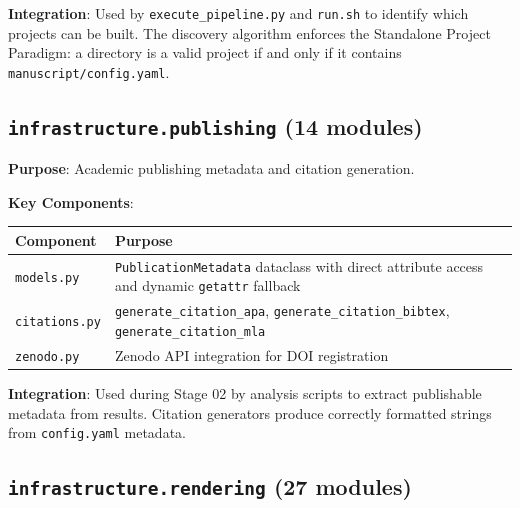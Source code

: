 \documentclass[
]{article}
\newcounter{none} %
\begin{document}
\textbf{Integration}: Used by \texttt{execute\_pipeline.py} and
\texttt{run.sh} to identify which projects can be built. The discovery
algorithm enforces the Standalone Project Paradigm: a directory is a
valid project if and only if it contains
\texttt{manuscript/config.yaml}.

\subsection{\texorpdfstring{\texttt{infrastructure.publishing} (14
modules)}{infrastructure.publishing (14 modules)}}\label{infrastructure.publishing-14-modules}

\textbf{Purpose}: Academic publishing metadata and citation generation.

\textbf{Key Components}:

{\def\LTcaptype{none} %
\begin{longtable}[]{@{}
  >{\raggedright\arraybackslash}p{}
  >{\raggedright\arraybackslash}p{}@{}}
\toprule\noalign{}
\begin{minipage}[b]{\linewidth}\raggedright
Component
\end{minipage} & \begin{minipage}[b]{\linewidth}\raggedright
Purpose
\end{minipage} \\
\midrule\noalign{}
\endhead
\bottomrule\noalign{}
\endlastfoot
\texttt{models.py} & \texttt{PublicationMetadata} dataclass with direct
attribute access and dynamic \texttt{getattr} fallback \\
\texttt{citations.py} & \texttt{generate\_citation\_apa},
\texttt{generate\_citation\_bibtex}, \texttt{generate\_citation\_mla} \\
\texttt{zenodo.py} & Zenodo API integration for DOI registration \\
\end{longtable}
}

\textbf{Integration}: Used during Stage 02 by analysis scripts to
extract publishable metadata from results. Citation generators produce
correctly formatted strings from \texttt{config.yaml} metadata.

\subsection{\texorpdfstring{\texttt{infrastructure.rendering} (27
modules)}{infrastructure.rendering (27 modules)}}\label{infrastructure.rendering-27-modules}
\end{document}
